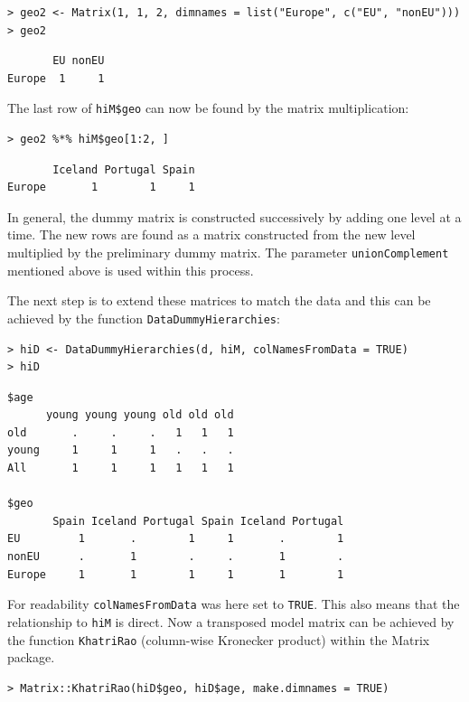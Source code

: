 \begin{verbatim}
> geo2 <- Matrix(1, 1, 2, dimnames = list("Europe", c("EU", "nonEU")))
> geo2
\end{verbatim}

\begin{verbatim}
       EU nonEU
Europe  1     1
\end{verbatim}

The last row of \texttt{hiM\$geo} can now be found by the matrix multiplication:

\begin{verbatim}
> geo2 %*% hiM$geo[1:2, ]
\end{verbatim}

\begin{verbatim}
       Iceland Portugal Spain
Europe       1        1     1
\end{verbatim}

In general, the dummy matrix is constructed successively by adding one level at a time. The new rows are found as a matrix constructed from the new level multiplied by the preliminary dummy matrix. The parameter \texttt{unionComplement} mentioned above is used within this process.

The next step is to extend these matrices to match the data and this can be achieved by the function \texttt{DataDummyHierarchies}:

\begin{verbatim}
> hiD <- DataDummyHierarchies(d, hiM, colNamesFromData = TRUE)
> hiD
\end{verbatim}

\begin{verbatim}
$age
      young young young old old old
old       .     .     .   1   1   1
young     1     1     1   .   .   .
All       1     1     1   1   1   1

$geo
       Spain Iceland Portugal Spain Iceland Portugal
EU         1       .        1     1       .        1
nonEU      .       1        .     .       1        .
Europe     1       1        1     1       1        1
\end{verbatim}

For readability \texttt{colNamesFromData} was here set to \texttt{TRUE}.
This also means that the relationship to \texttt{hiM} is direct.
Now a transposed model matrix can be achieved by the function \texttt{KhatriRao} (column-wise Kronecker product) within the Matrix package.

\begin{verbatim}
> Matrix::KhatriRao(hiD$geo, hiD$age, make.dimnames = TRUE)
\end{verbatim}

